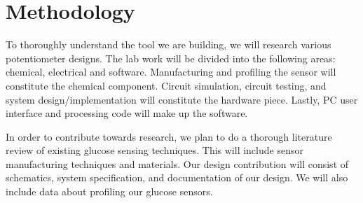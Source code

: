 \section{Methodology}

To thoroughly understand the tool we are building, we will research various potentiometer designs.
The lab work will be divided into the following areas: chemical, electrical and software. Manufacturing
and profiling the sensor will constitute the chemical component. Circuit simulation, circuit testing,
and system design/implementation will constitute the hardware piece. Lastly, PC user interface and
processing code will make up the software.

In order to contribute towards research, we plan to do a thorough literature review of existing glucose
sensing techniques. This will include sensor manufacturing techniques and materials. Our design
contribution will consist of schematics, system specification, and documentation of our design. We will
also include data about profiling our glucose sensors.